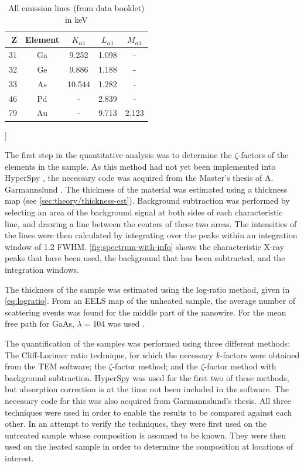 \begin{table}[h]
	\caption{All emission lines (from data booklet) in keV}
	\label{tab:emission-lines}
	\begin{center}
		\begin{tabular}{rcccc}
			Z & Element & $K_{\alpha1}$ & $L_{\alpha1}$ & $M_{\alpha1}$ \\ \midrule
			31 & Ga & 9.252 & 1.098 & - \\
			32 & Ge &  9.886 & 1.188 & - \\
			33 & As & 10.544 & 1.282 & - \\
			46 & Pd & - & 2.839 & - \\
			79 & Au & - & 9.713 & 2.123 \\
		\end{tabular}
	\end{center}
\end{table}]

The first step in the quantitative analysis was to determine the $\zeta$-factors of the elements in the sample. As this method had not yet been implemented into HyperSpy \cite{hyperspy}, the necessary code was acquired from the Master's thesis of A. Garmannslund \cite{andreas}. The thickness of the material was estimated using a thickness map (see \cref{sec:theory/thickness-est}). Background subtraction was performed by selecting an area of the background signal at both sides of each characteristic line, and drawing a line between the centers of these two areas. The intensities of the lines were then calculated by integrating over the peaks within an integration window of 1.2 FWHM. \cref{fig:spectrum-with-info} shows the characteristic X-ray peaks that have been used, the background that has been subtracted, and the integration windows.

The thickness of the sample was estimated using the log-ratio method, given in \cref{eq:logratio}. From an EELS map of the unheated sample, the average number of scattering events was found for the middle part of the nanowire. For the mean free path for GaAs, $\lambda=104$ was used \cite{andreas}.

The quantification of the samples was performed using three different methods: The Cliff-Lorimer ratio technique, for which the necessary $k$-factors were obtained from the TEM software; the $\zeta$-factor method; and the $\zeta$-factor method with background subtraction. HyperSpy was used for the first two of these methods, but absorption correction is at the time not been included in the software. The necessary code for this was also acquired from Garmannslund's thesis. All three techniques were used in order to enable the results to be compared against each other. In an attempt to verify the techniques, they were first used on the untreated sample whose composition is assumed to be known. They were then used on the heated sample in order to determine the composition at locations of interest.


